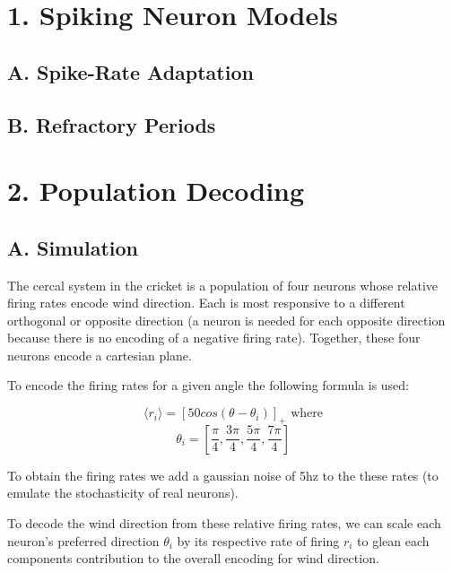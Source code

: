 \documentclass[12pt]{article}
\begin{document}
\maketitle

\section{1. Spiking Neuron Models}

\subsection{A. Spike-Rate Adaptation}



\subsection{B. Refractory Periods}



\section{2. Population Decoding}

\subsection{A. Simulation}

The cercal system in the cricket is a population of four neurons whose relative firing rates encode wind direction.  Each is most responsive to a different orthogonal or opposite direction (a neuron is needed for each opposite direction because there is no encoding of a negative firing rate).  Together, these four neurons encode a cartesian plane.  

To encode the firing rates for a given angle the following formula is used:

$$ \langle r_i \rangle=[50cos(\theta-\theta_i)]_+ \text{ where}$$
$$ \theta_i=[\frac{\pi}{4},\frac{3\pi}{4},\frac{5\pi}{4},\frac{7\pi}{4}] $$

To obtain the firing rates we add a gaussian noise of 5hz to the these rates (to emulate the stochasticity of real neurons).  

To decode the wind direction from these relative firing rates, we can scale each neuron's preferred direction $\theta_i$ by its respective rate of firing $r_i$ to glean each components contribution to the overall encoding for wind direction.  
\end{document}

